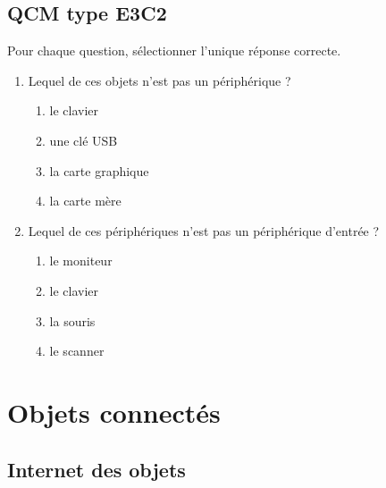 \subsection{QCM type E3C2}

\begin{exerciceB2}{}
Pour chaque question, sélectionner l'unique réponse correcte.

\begin{enumerate}
	\item Lequel de ces objets n'est pas un périphérique ?

\begin{multicols}{2}
\begin{enumerate}
	\item le clavier
	\item une clé USB
	\item la carte graphique
	\item la carte mère

\end{enumerate}

\end{multicols}

	\item Lequel de ces périphériques n'est pas un périphérique d'entrée ?

\begin{multicols}{2}
\begin{enumerate}
	\item le moniteur
	\item le clavier
	\item la souris
	\item le scanner

\end{enumerate}

\end{multicols}

\end{enumerate}


\end{exerciceB2}

\section{Objets connectés}

\subsection{Internet des objets}

\vspace*{-20pt}

